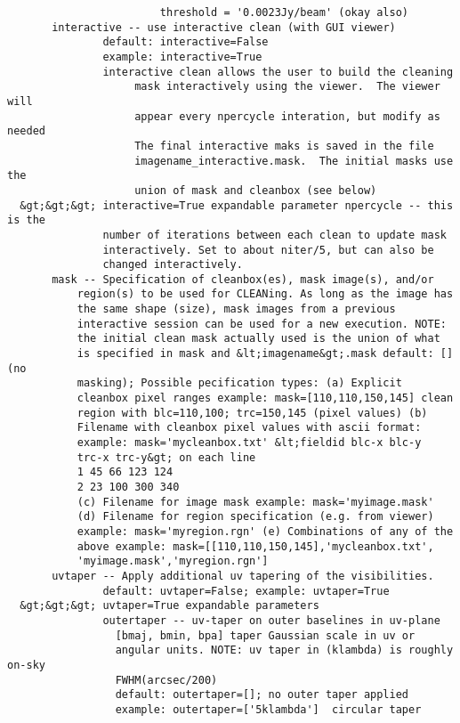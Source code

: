 \begin{verbatim}
                        threshold = '0.0023Jy/beam' (okay also)
       interactive -- use interactive clean (with GUI viewer)
               default: interactive=False
               example: interactive=True
               interactive clean allows the user to build the cleaning
                    mask interactively using the viewer.  The viewer will
                    appear every npercycle interation, but modify as needed
                    The final interactive maks is saved in the file
                    imagename_interactive.mask.  The initial masks use the
                    union of mask and cleanbox (see below)
  &gt;&gt;&gt; interactive=True expandable parameter npercycle -- this is the
               number of iterations between each clean to update mask
               interactively. Set to about niter/5, but can also be
               changed interactively.
       mask -- Specification of cleanbox(es), mask image(s), and/or
           region(s) to be used for CLEANing. As long as the image has
           the same shape (size), mask images from a previous
           interactive session can be used for a new execution. NOTE:
           the initial clean mask actually used is the union of what
           is specified in mask and &lt;imagename&gt;.mask default: [] (no
           masking); Possible pecification types: (a) Explicit
           cleanbox pixel ranges example: mask=[110,110,150,145] clean
           region with blc=110,100; trc=150,145 (pixel values) (b)
           Filename with cleanbox pixel values with ascii format:
           example: mask='mycleanbox.txt' &lt;fieldid blc-x blc-y
           trc-x trc-y&gt; on each line 
           1 45 66 123 124 
           2 23 100 300 340
           (c) Filename for image mask example: mask='myimage.mask'
           (d) Filename for region specification (e.g. from viewer)
           example: mask='myregion.rgn' (e) Combinations of any of the
           above example: mask=[[110,110,150,145],'mycleanbox.txt',
           'myimage.mask','myregion.rgn']
       uvtaper -- Apply additional uv tapering of the visibilities.
               default: uvtaper=False; example: uvtaper=True
  &gt;&gt;&gt; uvtaper=True expandable parameters
               outertaper -- uv-taper on outer baselines in uv-plane
                 [bmaj, bmin, bpa] taper Gaussian scale in uv or 
                 angular units. NOTE: uv taper in (klambda) is roughly on-sky 
                 FWHM(arcsec/200)
                 default: outertaper=[]; no outer taper applied
                 example: outertaper=['5klambda']  circular taper 

\end{verbatim}
